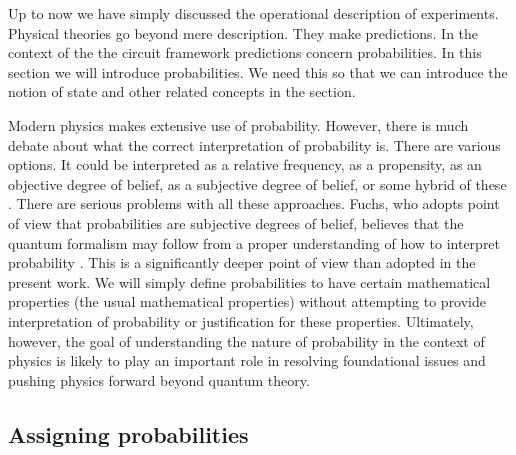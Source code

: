 \documentclass[10pt]{article}
\begin{document}
Up to now we have simply discussed the operational description of experiments.  Physical theories go beyond mere description.  They make predictions. In the context of the the circuit framework predictions concern probabilities.  In this section we will introduce probabilities.   We need this so that we can introduce the notion of state and other related concepts in the section.

Modern physics makes extensive use of probability.  However, there is much debate about what the correct interpretation of probability is.  There are various options.  It could be interpreted as a relative frequency, as a propensity, as an objective degree of belief, as a subjective degree of belief, or some hybrid of these \cite{gillies2002philosophical}.  There are serious problems with all these approaches.  Fuchs, who adopts point of view that probabilities are subjective degrees of belief, believes that the quantum formalism may follow from a proper understanding of how to interpret probability \cite{fuchs2010qbism}. This is a significantly deeper point of view than adopted in the present work.  We will simply define probabilities to have certain mathematical properties (the usual mathematical properties) without attempting to provide interpretation of probability or justification for these properties.  Ultimately, however, the goal of understanding the nature of probability in the context of physics is likely to play an important role in resolving foundational issues and pushing physics forward beyond quantum theory.

\subsection{Assigning probabilities}
\end{document}
